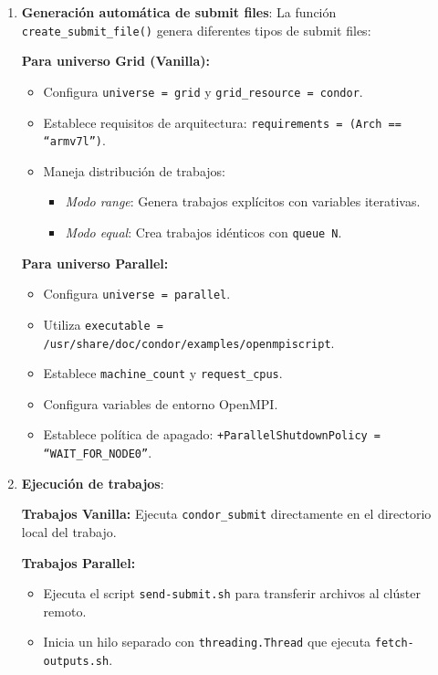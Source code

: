 \begin{enumerate}
	\item \textbf{Generación automática de submit files}: La función \texttt{create\_submit\_file()} genera diferentes tipos de submit files:

	      \textbf{Para universo Grid (Vanilla):}
	      \begin{itemize}
		      \item Configura \texttt{universe = grid} y \texttt{grid\_resource = condor}.
		      \item Establece requisitos de arquitectura: \texttt{requirements = (Arch == ``armv7l'')}.
		      \item Maneja distribución de trabajos:
		            \begin{itemize}
			            \item \textit{Modo range}: Genera trabajos explícitos con variables iterativas.
			            \item \textit{Modo equal}: Crea trabajos idénticos con \texttt{queue N}.
		            \end{itemize}
	      \end{itemize}

	      \textbf{Para universo Parallel:}
	      \begin{itemize}
		      \item Configura \texttt{universe = parallel}.
		      \item Utiliza \texttt{executable = /usr/share/doc/condor/examples/openmpiscript}.
		      \item Establece \texttt{machine\_count} y \texttt{request\_cpus}.
		      \item Configura variables de entorno OpenMPI.
		      \item Establece política de apagado: \texttt{+ParallelShutdownPolicy = ``WAIT\_FOR\_NODE0''}.
	      \end{itemize}

	\item \textbf{Ejecución de trabajos}:

	      \textbf{Trabajos Vanilla:} Ejecuta \texttt{condor\_submit} directamente en el directorio local del trabajo.

	      \textbf{Trabajos Parallel:} 
	      \begin{itemize}
		      \item Ejecuta el script \texttt{send-submit.sh} para transferir archivos al clúster remoto.
		      \item Inicia un hilo separado con \texttt{threading.Thread} que ejecuta \texttt{fetch-outputs.sh}.
	      \end{itemize}


\end{enumerate}
